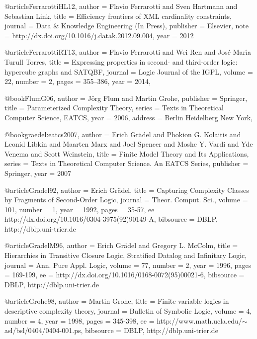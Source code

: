 \documentclass{article}
\begin{document}
@article{FerrarottiHL12,
  author    = {Flavio Ferrarotti and
               Sven Hartmann and
               Sebastian Link},
  title     = {Efficiency frontiers of {XML} cardinality constraints},
  journal   = {Data \& Knowledge Engineering (In Press)},
  publisher = {Elsevier},
  note      = {\url{http://dx.doi.org/10.1016/j.datak.2012.09.004}},
  year      = {2012}
}	

@article{FerrarottiRT13,
  author    = {Flavio Ferrarotti and
               Wei Ren and
               Jos\'e Mar\'{\i}a {Turull Torres}},
  title     = {Expressing properties in second- and third-order logic: hypercube
               graphs and {SATQBF}},
  journal   = {Logic Journal of the {IGPL}},
  volume    = {22},
  number    = {2},
  pages     = {355--386},
  year      = {2014},
}


@book{FlumG06,
  author = {J{\"o}rg Flum and Martin Grohe},
  publisher = {Springer},
  title = {Parameterized Complexity Theory},
  series = {Texts in Theoretical Computer Science, EATCS},
  year = {2006},
  address   = {Berlin Heidelberg New York},
}


@book{graedel:eatcs2007,
  author    = {Erich Gr{\"{a}}del and
               Phokion G. Kolaitis and
               Leonid Libkin and
               Maarten Marx and
               Joel Spencer and
               Moshe Y. Vardi and
               Yde Venema and
               Scott Weinstein},
  title     = {Finite Model Theory and Its Applications},
  series    = {Texts in Theoretical Computer Science. An {EATCS} Series},
  publisher = {Springer},
  year      = {2007}}

@article{Gradel92,
  author    = {Erich Gr{\"a}del},
  title     = {Capturing Complexity Classes by Fragments of Second-Order
               Logic},
  journal   = {Theor. Comput. Sci.},
  volume    = {101},
  number    = {1},
  year      = {1992},
  pages     = {35-57},
  ee        = {http://dx.doi.org/10.1016/0304-3975(92)90149-A},
  bibsource = {DBLP, http://dblp.uni-trier.de}
}

@article{GradelM96,
  author    = {Erich Gr{\"a}del and
               Gregory L. McColm},
  title     = {Hierarchies in Transitive Closure Logic, Stratified Datalog
               and Infinitary Logic},
  journal   = {Ann. Pure Appl. Logic},
  volume    = {77},
  number    = {2},
  year      = {1996},
  pages     = {169-199},
  ee        = {http://dx.doi.org/10.1016/0168-0072(95)00021-6},
  bibsource = {DBLP, http://dblp.uni-trier.de}
}

@article{Grohe98,
  author    = {Martin Grohe},
  title     = {Finite variable logics in descriptive complexity theory},
  journal   = {Bulletin of Symbolic Logic},
  volume    = {4},
  number    = {4},
  year      = {1998},
  pages     = {345-398},
  ee        = {http://www.math.ucla.edu/$\sim$asl/bsl/0404/0404-001.ps},
  bibsource = {DBLP, http://dblp.uni-trier.de}
}
\end{document}
